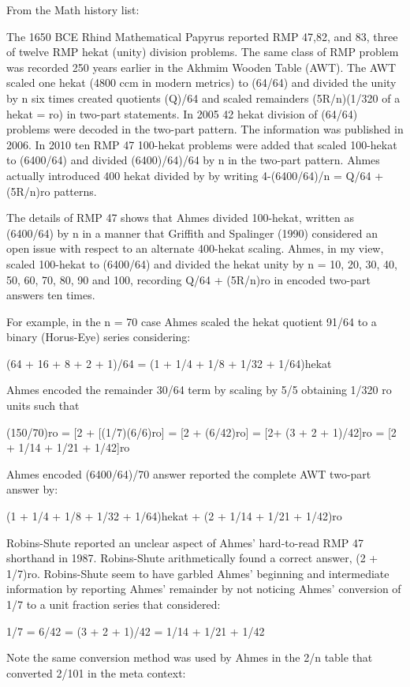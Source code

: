 \documentclass[12pt]{article}
\begin{document}
From the Math history list:

The 1650 BCE Rhind Mathematical Papyrus reported RMP 47,82, and 83, three of twelve RMP hekat (unity) division problems. The same class of RMP problem was recorded 250 years earlier in the Akhmim Wooden Table (AWT). The AWT scaled one hekat (4800 ccm in modern metrics) to (64/64) and divided the unity by n six times created quotients (Q)/64 and scaled remainders (5R/n)(1/320 of a hekat = ro) in two-part statements. In 2005 42 hekat division of (64/64) problems were decoded in the two-part pattern. The information was published in 2006. In 2010 ten RMP 47 100-hekat problems were added that scaled 100-hekat to (6400/64) and divided (6400)/64)/64 by n in the two-part pattern. Ahmes actually introduced 400 hekat divided by by writing 4-(6400/64)/n = Q/64 + (5R/n)ro patterns.

The details of RMP 47 shows that Ahmes divided 100-hekat, written as (6400/64) by n in a manner that Griffith and Spalinger (1990) considered an open issue with respect to an alternate 400-hekat scaling. Ahmes, in my view, scaled 100-hekat to (6400/64) and divided the hekat unity by n = 10, 20, 30, 40, 50, 60, 70, 80, 90 and 100, recording Q/64 + (5R/n)ro in encoded two-part answers ten times. 

For example, in the n = 70 case Ahmes scaled the hekat quotient 91/64 to a binary (Horus-Eye) series considering:

(64 + 16 + 8 + 2 + 1)/64 = (1 + 1/4 + 1/8 + 1/32 + 1/64)hekat 

Ahmes encoded the remainder 30/64 term by scaling by 5/5 obtaining 1/320 ro units such that

(150/70)ro = [2 + [(1/7)(6/6)ro] = [2 + (6/42)ro] = [2+ (3 + 2 + 1)/42]ro = [2 + 1/14 + 1/21 + 1/42]ro 

Ahmes encoded (6400/64)/70 answer reported the complete AWT two-part answer by:

(1 + 1/4 + 1/8 + 1/32 + 1/64)hekat + (2 + 1/14 + 1/21 + 1/42)ro

Robins-Shute reported an unclear aspect of Ahmes' hard-to-read RMP 47 shorthand in 1987. Robins-Shute arithmetically found a correct answer, (2 + 1/7)ro. Robins-Shute seem to have garbled Ahmes' beginning and intermediate information by reporting Ahmes' remainder by not noticing Ahmes' conversion of 1/7 to a unit fraction series that considered:

1/7 = 6/42 = (3 + 2 + 1)/42 = 1/14 + 1/21 + 1/42 

Note the same conversion method was used by Ahmes in the 2/n table that converted 2/101 in the meta context:
\end{document}
